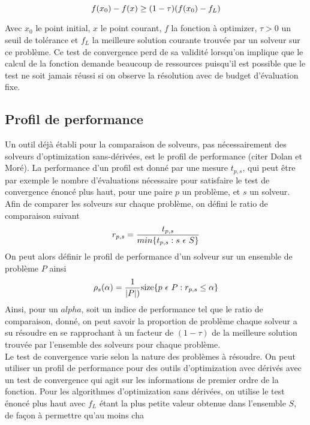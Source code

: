 \documentclass[letterpaper]{scrartcl}
\begin{document}
\begin{equation}
f(x_0) - f(x) \geq (1-\tau)(f(x_0)-f_L)\\
\end{equation} 

Avec $x_0$ le point initial, $x$ le point courant, $f$ la fonction à optimizer, $\tau>0$ un seuil de tolérance et $f_L$ la meilleure solution courante trouvée par un solveur sur ce problème. Ce test de convergence perd de sa validité lorsqu'on implique que le calcul de la fonction demande beaucoup de ressources puisqu'il est possible que le test ne soit jamais réussi si on observe la résolution avec de budget d'évaluation fixe. \\ 
\subsection{Profil de performance}
Un outil déjà établi pour la comparaison de solveurs, pas nécessairement des solveurs d'optimization sans-dérivées, est le profil de performance (citer Dolan et Moré). La performance d'un profil est donné par une mesure $t_{p,s}$, qui peut être par exemple le nombre d'évaluations nécessaire pour satisfaire le test de convergence énoncé plus haut, pour une paire $p$ un problème, et $s$ un solveur. Afin de comparer les solveurs sur chaque problème, on défini le ratio de comparaison suivant
\begin{equation}
r_{p,s}=\frac{t_{p,s}}{min\{t_{p,s} : s\  \epsilon \  S\}}\\
\end{equation}
On peut alors définir le profil de performance d'un solveur sur un ensemble de problème $P$ ainsi
\begin{equation}
\rho_s(\alpha)=\frac{1}{|P|)}\text{size}\{p\ \epsilon \ P : r_{p,s} \leq \alpha \}\\
\end{equation}
Ainsi, pour un $alpha$, soit un indice de performance tel que le ratio de comparaison,  donné, on peut savoir la proportion de problème chaque solveur a su résoudre en se rapprochant à un facteur de $(1-\tau)$ de la meilleure solution trouvée par l'ensemble des solveurs pour chaque problème. \\
Le test de convergence varie selon la nature des problèmes à résoudre. On peut utiliser un profil de performance pour des outils d'optimization avec dérivés avec un test de convergence qui agit sur les informations de premier ordre de la fonction. Pour les algorithmes d'optimization sans dérivées, on utilise le test énoncé plus haut avec $f_L$ étant la plus petite valeur obtenue dans l'ensemble $S$, de façon à permettre qu'au moins cha
\end{document}
